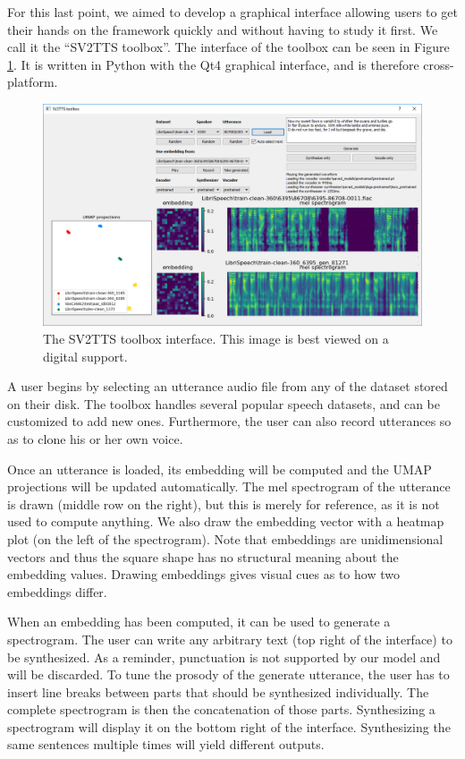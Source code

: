 \documentclass[a4paper, oneside, 12pt, english]{article}
\begin{document}
For this last point, we aimed to develop a graphical interface allowing users to get their hands on the framework quickly and without having to study it first. We call it the ``SV2TTS toolbox''. The interface of the toolbox can be seen in Figure \ref{toolbox}. It is written in Python with the Qt4 graphical interface, and is therefore cross-platform.

\begin{figure}[h]
	\centering
	\includegraphics[width=1\linewidth]{images/toolbox.png}
	\caption{The SV2TTS toolbox interface. This image is best viewed on a digital support.}
	\label{toolbox}
\end{figure}

A user begins by selecting an utterance audio file from any of the dataset stored on their disk. The toolbox handles several popular speech datasets, and can be customized to add new ones. Furthermore, the user can also record utterances so as to clone his or her own voice.

Once an utterance is loaded, its embedding will be computed and the UMAP projections will be updated automatically. The mel spectrogram of the utterance is drawn (middle row on the right), but this is merely for reference, as it is not used to compute anything. We also draw the embedding vector with a heatmap plot (on the left of the spectrogram). Note that embeddings are unidimensional vectors and thus the square shape has no structural meaning about the embedding values. Drawing embeddings gives visual cues as to how two embeddings differ.

When an embedding has been computed, it can be used to generate a spectrogram. The user can write any arbitrary text (top right of the interface) to be synthesized. As a reminder, punctuation is not supported by our model and will be discarded. To tune the prosody of the generate utterance, the user has to insert line breaks between parts that should be synthesized individually. The complete spectrogram is then the concatenation of those parts. Synthesizing a spectrogram will display it on the bottom right of the interface. Synthesizing the same sentences multiple times will yield different outputs.
\end{document}

